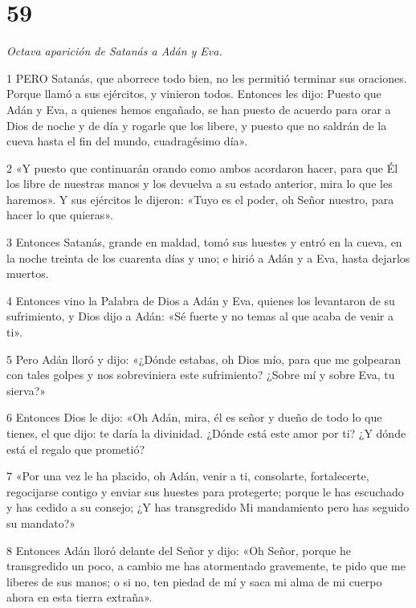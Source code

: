 \chapter{59}

\par \textit{Octava aparición de Satanás a Adán y Eva.}

\par 1 PERO Satanás, que aborrece todo bien, no les permitió terminar sus oraciones. Porque llamó a sus ejércitos, y vinieron todos. Entonces les dijo: Puesto que Adán y Eva, a quienes hemos engañado, se han puesto de acuerdo para orar a Dios de noche y de día y rogarle que los libere, y puesto que no saldrán de la cueva hasta el fin del mundo, cuadragésimo día».

\par 2 «Y puesto que continuarán orando como ambos acordaron hacer, para que Él los libre de nuestras manos y los devuelva a su estado anterior, mira lo que les haremos». Y sus ejércitos le dijeron: «Tuyo es el poder, oh Señor nuestro, para hacer lo que quieras».

\par 3 Entonces Satanás, grande en maldad, tomó sus huestes y entró en la cueva, en la noche treinta de los cuarenta días y uno; e hirió a Adán y a Eva, hasta dejarlos muertos.

\par 4 Entonces vino la Palabra de Dios a Adán y Eva, quienes los levantaron de su sufrimiento, y Dios dijo a Adán: «Sé fuerte y no temas al que acaba de venir a ti».

\par 5 Pero Adán lloró y dijo: «¿Dónde estabas, oh Dios mío, para que me golpearan con tales golpes y nos sobreviniera este sufrimiento? ¿Sobre mí y sobre Eva, tu sierva?»

\par 6 Entonces Dios le dijo: «Oh Adán, mira, él es señor y dueño de todo lo que tienes, el que dijo: te daría la divinidad. ¿Dónde está este amor por ti? ¿Y dónde está el regalo que prometió?

\par 7 «Por una vez le ha placido, oh Adán, venir a ti, consolarte, fortalecerte, regocijarse contigo y enviar sus huestes para protegerte; porque le has escuchado y has cedido a su consejo; ¿Y has transgredido Mi mandamiento pero has seguido su mandato?»

\par 8 Entonces Adán lloró delante del Señor y dijo: «Oh Señor, porque he transgredido un poco, a cambio me has atormentado gravemente, te pido que me liberes de sus manos; o si no, ten piedad de mí y saca mi alma de mi cuerpo ahora en esta tierra extraña».

